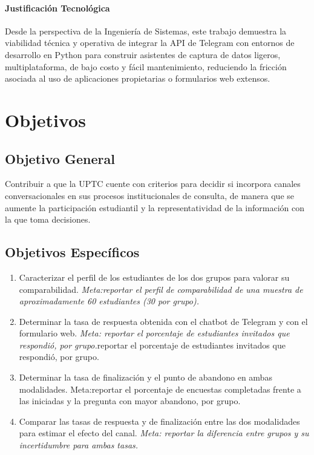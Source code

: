 \documentclass[12pt,letterpaper]{article}
\begin{document}
\paragraph{Justificación Tecnológica}
Desde la perspectiva de la Ingeniería de Sistemas, este trabajo demuestra la viabilidad técnica y operativa de integrar la API de Telegram con entornos de desarrollo en Python para construir asistentes de captura de datos ligeros, multiplataforma, de bajo costo y fácil mantenimiento, reduciendo la fricción asociada al uso de aplicaciones propietarias o formularios web extensos.

\section{Objetivos}
\subsection{Objetivo General}
Contribuir a que la UPTC cuente con criterios para decidir si incorpora canales conversacionales en sus procesos institucionales de consulta, de manera que se aumente la participación estudiantil y la representatividad de la información con la que toma decisiones.

\subsection{Objetivos Específicos}
\begin{enumerate}
  \item Caracterizar el perfil de los estudiantes de los dos grupos para valorar su comparabilidad. \textit{Meta:reportar el perfil de comparabilidad de una muestra de aproximadamente 60 estudiantes (30 por grupo).}
  \item Determinar la tasa de respuesta obtenida con el chatbot de Telegram y con el formulario web. \textit{Meta: reportar el porcentaje de estudiantes invitados que respondió, por grupo.}reportar el porcentaje de estudiantes invitados que respondió, por grupo.
  \item Determinar la tasa de finalización y el punto de abandono en ambas modalidades. \textit{}Meta:reportar el porcentaje de encuestas completadas frente a las iniciadas y la pregunta con mayor abandono, por grupo.
  \item Comparar las tasas de respuesta y de finalización entre las dos modalidades para estimar el efecto del canal. \textit{Meta: reportar la diferencia entre grupos y su incertidumbre para ambas tasas.}
\end{enumerate}
\end{document}
